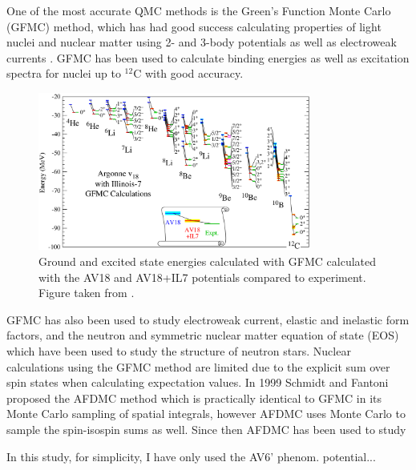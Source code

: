 One of the most accurate QMC methods is the Green's Function Monte Carlo (GFMC) method, which has had good success calculating properties of light nuclei and nuclear matter using 2- and 3-body potentials as well as electroweak currents \cite{carlson2015}. GFMC has been used to calculate binding energies as well as excitation spectra for nuclei up to $^{12}$C with good accuracy.
\begin{figure}[h!]
   \centering
   \includegraphics[width=0.8\textwidth]{figures/gfmc_energies.png}
   \caption{Ground and excited state energies calculated with GFMC calculated with the AV18 and AV18+IL7 potentials compared to experiment. Figure taken from \cite{carlson2015}.}
   \label{fig:energy_jaslin}
\end{figure}
GFMC has also been used to study electroweak current, elastic and inelastic form factors, and the neutron and symmetric nuclear matter equation of state (EOS) which have been used to study the structure of neutron stars. Nuclear calculations using the GFMC method are limited due to the explicit sum over spin states when calculating expectation values. In 1999 Schmidt and Fantoni \cite{schmidt1999} proposed the AFDMC method which is practically identical to GFMC in its Monte Carlo sampling of spatial integrals, however AFDMC uses Monte Carlo to sample the spin-isospin sums as well. Since then AFDMC has been used to study 


In this study, for simplicity, I have only used the AV6' phenom. potential...

